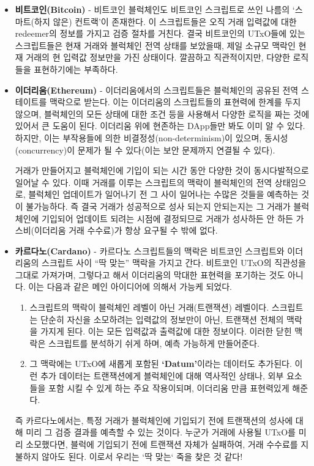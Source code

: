 \documentclass[a4paper, 11pt]{article}
\begin{document}
    \begin{itemize}
        \item \textbf{비트코인(Bitcoin)} - 비트코인 블럭체인도 비트코인 스크립트로 쓰인 나름의 `스마트(하지 않은) 컨트랙'이 존재한다. 이 스크립트들은 오직 거래 입력값에 대한 redeemer의 정보를 가지고 검증 절차를 거친다. 결국 비트코인의 UTxO들에 있는 스크립트들은 현재 거래와 블럭체인 전역 상태를 보았을때, 제일 소규모 맥락인 현재 거래의 현 입력값 정보만을 가진 상태이다. 깔끔하고 직관적이지만, 다양한 로직들을 표현하기에는 부족하다.
        
        \item \textbf{이더리움(Ethereum)} - 이더리움에서의 스크립트들은 블럭체인의 공유된 전역 스테이트를 맥락으로 받는다. 이는 이더리움의 스크립트들의 표현력에 한계를 두지 않으며, 블럭체인의 모든 상태에 대한 조건 등을 사용해서 다양한 로직을 짜는 것에 있어서 큰 도움이 된다. 이더리움 위에 현존하는 DApp들만 봐도 이미 알 수 있다. 하지만, 이는 부작용들에 의한 비결정성(non-determinism)이 있으며, 동시성(concurrency)이 문제가 될 수 있다(이는 보안 문제까지 연결될 수 있다).
        
        거래가 만들어지고 블럭체인에 기입이 되는 시간 동안 다양한 것이 동시다발적으로 일어날 수 있다. 이때 거래를 이루는 스크립트의 맥락이 블럭체인의 전역 상태임으로, 블럭체인 업데이트가 일어나기 전 그 사이 일어나는 수많은 것들을 예측하는 것이 불가능하다. 즉 결국 거래가 성공적으로 성사 되는지 안되는지는 그 거래가 블럭체인에 기입되어 업데이트 되려는 시점에 결정되므로 거래가 성사하든 안 하든 가스비(이더리움 거래 수수료)가 항상 요구될 수 밖에 없다.

        \item \textbf{카르다노(Cardano)} - 카르다노 스크립트들의 맥락은 비트코인 스크립트와 이더리움의 스크립트 사이 ``딱 맞는'' 맥락을 가지고 간다. 비트코인 UTxO의 직관성을 그대로 가져가며, 그렇다고 해서 이더리움의 막대한 표현력을 포기하는 것도 아니다. 이는 다음과 같은 메인 아이디어에 의해서 가능케 되었다.
        
        \begin{enumerate}
            \item 스크립트의 맥락이 블럭체인 레벨이 아닌 거래(트랜잭션) 레벨이다. 스크립트는 단순히 자신을 소모하려는 입력값의 정보만이 아닌, 트랜잭션 전체의 맥락을 가지게 된다. 이는 모든 입력값과 출력값에 대한 정보이다. 이러한 닫힌 맥락은 스크립트를 분석하기 쉬게 하며, 예측 가능하게 만들어준다.
            \item 그 맥락에는 UTxO에 새롭게 포함된 \textbf{`Datum'}이라는 데이터도 추가된다. 이런 추가 데이터는 트랜잭션에게 블럭체인에 대해 역사적인 상태나, 외부 요소들을 포함 시킬 수 있게 하는 주요 작용이되며, 이더리움 만큼 표현력있게 해준다.
        \end{enumerate}

        즉 카르다노에서는, 특정 거래가 블럭체인에 기입되기 전에 트랜잭션의 성사에 대해 미리 그 검증 결과를 예측할 수 있는 것이다. 누군가 거래에 사용될 UTxO를 미리 소모했다면, 블럭에 기입되기 전에 트랜잭션 자체가 실패하여, 거래 수수료를 지불하지 않아도 된다. 이로서 우리는 `딱 맞는` 죽을 찾은 것 같다! 
    \end{itemize}
\end{document}
